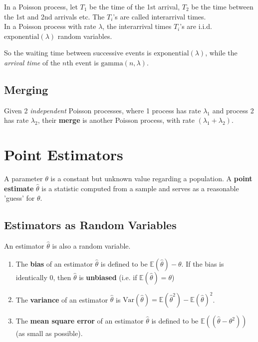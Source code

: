 \documentclass{article}
\begin{document}
\begin{definition}
    In a Poisson process, let $T_{1}$ be the time of the 1st arrival, $T_{2}$ be the time between the 1st and 2nd arrivals etc. The $T_i$'s are called interarrival times. \\ 
    \noindent In a Poisson process with rate $\lambda$, the interarrival times $T_i$'s are i.i.d. $\text{exponential}(\lambda)$ random variables. 
\end{definition} So the waiting time between successive events is $\text{exponential}(\lambda)$, while the \textit{arrival time} of the $n$th event is $\text{gamma}(n, \lambda)$. 

\subsection{Merging}
\begin{definition}
    Given 2 \textit{independent} Poisson processes, where 1 process has rate $\lambda_1$ and process 2 has rate $\lambda_2$, their \textbf{merge} is another Poisson process, with rate $(\lambda_1 + \lambda_2)$. 
\end{definition}


\section{Point Estimators}

A parameter $\theta$ is a constant but unknown value regarding a population. A \textbf{point estimate} $\hat{\theta}$ is a statistic computed from a sample and serves as a reasonable 'guess' for $\theta$. 

\subsection{Estimators as Random Variables}

\begin{definition} An estimator $\hat{\theta}$ is also a random variable. \begin{enumerate}
        \item The \textbf{bias} of an estimator $\hat{\theta}$ is defined to be $ \mathbb{E}(\hat{\theta}) - \theta$. If the bias is identically 0, then $\hat{\theta}$ is \textbf{unbiased} (i.e. if $ \mathbb{E}(\hat{\theta}) = \theta$) 
        \item The \textbf{variance} of an estimator $\hat{\theta}$ is $ \text{Var} (\hat{\theta}) = \mathbb{E} (\hat{\theta}^{2}) - \mathbb{E}(\hat{\theta})^{2}$. 
        \item The \textbf{mean square error} of an estimator $\hat{\theta}$ is defined to be $ \mathbb{E}((\hat{\theta} - \theta^{2}))$ (as small as possible). 
    \end{enumerate}
\end{definition}
\end{document}
